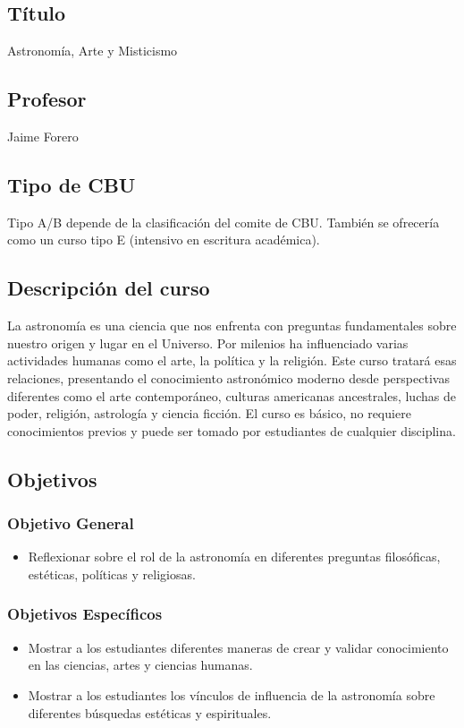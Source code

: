 \documentclass{report}
\begin{document}
\subsection*{\bf T\'itulo}
Astronom\'ia, Arte y Misticismo\\

\subsection*{\bf Profesor}
Jaime Forero\\

\subsection*{Tipo de CBU}
Tipo A/B depende de la clasificaci\'on del comite de CBU. Tambi\'en se
ofrecer\'ia como un curso tipo E (intensivo en escritura acad\'emica). 


\subsection*{Descripci\'on del curso}
La astronom\'ia es una ciencia que nos enfrenta con preguntas
fundamentales sobre nuestro origen y lugar en el Universo. Por
milenios ha influenciado varias actividades humanas como el arte, la
pol\'itica y la religi\'on. Este curso tratar\'a esas relaciones,
presentando el conocimiento astron\'omico moderno desde perspectivas
diferentes como el arte contempor\'aneo, culturas americanas
ancestrales, luchas de poder, religi\'on, astrolog\'ia y ciencia
ficci\'on. El curso es b\'asico, no requiere conocimientos previos y
puede ser tomado por estudiantes de cualquier disciplina.  
\subsection*{Objetivos}

\subsubsection*{Objetivo General}
\begin{itemize}
\item Reflexionar sobre el rol de la astronom\'ia en diferentes
  preguntas filos\'oficas, est\'eticas, pol\'iticas y religiosas. 
\end{itemize}

\subsubsection*{Objetivos Espec\'ificos}
\begin{itemize}
\item Mostrar a los estudiantes diferentes maneras de crear
  y validar conocimiento en las ciencias, artes y ciencias humanas.
\item Mostrar a los estudiantes los v\'inculos de influencia de la
  astronom\'ia  sobre diferentes b\'usquedas est\'eticas y
  espirituales.  
\end{itemize}
\end{document}
